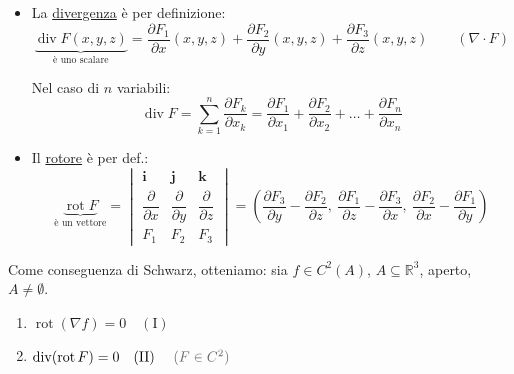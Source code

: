 \begin{itemize}
    \item La \underline{divergenza} è per definizione:
    \[
    \underbrace{\operatorname{div} F(x, y, z)}_{\text{è uno scalare}} = \frac{\partial F_1}{\partial x}(x, y, z) + \frac{\partial F_2}{\partial y}(x, y, z) + \frac{\partial F_3}{\partial z}(x, y, z) \qquad (\nabla \cdot F)
    \]

    Nel caso di $n$ variabili:
    \[
    \operatorname{div} F = \sum_{k=1}^n \frac{\partial F_k}{\partial x_k} = \frac{\partial F_1}{\partial x_1} + \frac{\partial F_2}{\partial x_2} + \dots + \frac{\partial F_n}{\partial x_n}
    \]

    \item Il \underline{rotore} è per def.:
    \[
    \underbrace{\operatorname{rot} F}_{\text{è un vettore}} = \begin{vmatrix}
    \mathbf{i} & \mathbf{j} & \mathbf{k} \\
    \dfrac{\partial}{\partial x} & \dfrac{\partial}{\partial y} & \dfrac{\partial}{\partial z} \\
    F_1 & F_2 & F_3
    \end{vmatrix} = \left( \frac{\partial F_3}{\partial y} - \frac{\partial F_2}{\partial z}, \ \frac{\partial F_1}{\partial z} - \frac{\partial F_3}{\partial x}, \ \frac{\partial F_2}{\partial x} - \frac{\partial F_1}{\partial y} \right)
    \]
\end{itemize}

\begin{prop*}
Come conseguenza di Schwarz, otteniamo: sia $f \in C^2(A)$, $A \subseteq \mathbb{R}^3$, aperto, $A \neq \emptyset$.
\begin{enumerate}
    \item $\operatorname{rot}(\nabla f) = 0 \quad (\text{I})$
    \item $\operatorname{div}(\operatorname{rot} F) = 0 \quad (\text{II}) \quad \text{\pencilnote{($F \in C^2$)}}$
\end{enumerate}
\end{prop*}

